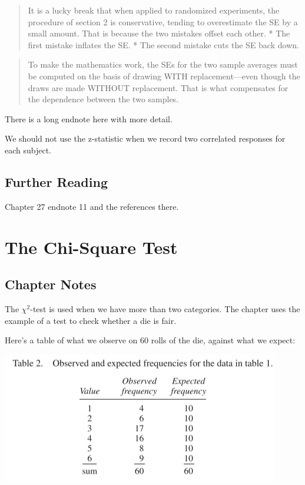 \documentclass[
]{book}
\begin{document}
\begin{quote}
It is a lucky break that when applied to randomized experiments, the procedure of section 2 is conservative, tending to overestimate the SE by a small amount. That is because the two mistakes offset each other.
* The first mistake inflates the SE.
* The second mistake cuts the SE back down.
\end{quote}

\begin{quote}
To make the mathematics work, the SEs for the two sample averages must be computed on the basis of drawing WITH replacement---even though the draws are made WITHOUT replacement. That is what compensates for the dependence between the two samples.
\end{quote}

There is a long endnote here with more detail.

We should not use the z-statistic when we record two correlated responses for each subject.

\hypertarget{further-reading-10}{%
\section*{Further Reading}\label{further-reading-10}}

Chapter 27 endnote 11 and the references there.

\hypertarget{chi_square}{%
\chapter{The Chi-Square Test}\label{chi_square}}

\hypertarget{chapter-notes-27}{%
\section{Chapter Notes}\label{chapter-notes-27}}

The \(\chi^2\)-test is used when we have more than two categories. The chapter uses the example of a test to check whether a die is fair.

Here's a table of what we observe on 60 rolls of the die, against what we expect:

\includegraphics{images/Ch28Img01.png}
\end{document}
